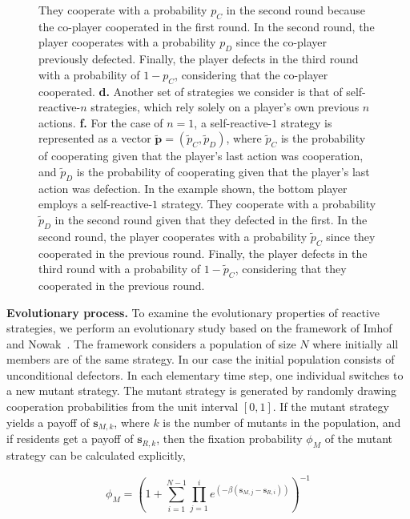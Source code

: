 \documentclass{article}
\theoremstyle{definition}
\begin{document}
\begin{figure}[h!]
{  They cooperate with a probability $p_C$ in the second round because the co-player
  cooperated in the first round. In the second round, the player cooperates with a
  probability $p_D$ since the co-player previously defected. Finally, the player
  defects in the third round with a probability of $1 - p_C$, considering that the
  co-player cooperated.
  \textbf{d.} Another set of strategies we consider is that of self-reactive-$n$
  strategies, which rely solely on a player's own previous $n$ actions.
  \textbf{f.} For the case of $n = 1$, a self-reactive-$1$ strategy is represented
  as a vector $\mathbf{\tilde{p}} = (\tilde{p}_C, \tilde{p}_D)$, where
  $\tilde{p}_C$ is the probability of cooperating given that the player's last
  action was cooperation, and $\tilde{p}_D$ is the probability of cooperating
  given that the player's last action was defection. In the example shown, the
  bottom player employs a self-reactive-$1$ strategy. They cooperate with a
  probability $\tilde{p}_D$ in the second round given that they defected in the
  first. In the second round, the player cooperates with a probability
  $\tilde{p}_C$ since they cooperated in the previous round. Finally, the player
  defects in the third round with a probability of $1 - \tilde{p}_C$, considering
  that they cooperated in the previous round.}
\end{figure}

\textbf{Evolutionary process.} To examine the evolutionary properties of
reactive strategies, we perform an evolutionary study based on the framework of
Imhof and Nowak~\cite{imhof:royal:2010}. The framework considers a population
of size \(N\) where initially all members are of the same strategy. In our case
the initial population consists of unconditional defectors. In each elementary
time step, one individual switches to a new mutant strategy. The mutant strategy
is generated by randomly drawing cooperation probabilities from the unit
interval \([0,1]\). If the mutant strategy yields a payoff of \(\mathbf{s}_{M, k}\),
where \(k\) is the number of mutants in the population, and if residents get a
payoff of \(\mathbf{s}_{R, k}\), then the fixation probability \(\phi_{M}\) of the
mutant strategy can be calculated explicitly,

\begin{equation}\label{eq:fixation_probability}
  \phi_{M} = \left(1 + \sum_{i=1}^{N - 1} \prod_{j=1}^{i} e^{(- \beta (\mathbf{s}_{M, j} - \mathbf{s}_{R, i}))} \right)^{-1}
\end{equation}
\end{document}
